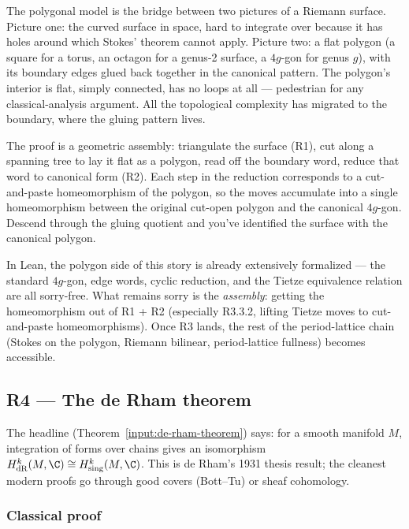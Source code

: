 \begin{layman}
The polygonal model is the bridge between two pictures of a Riemann
surface.  Picture one: the curved surface in space, hard to
integrate over because it has holes around which Stokes' theorem
cannot apply.  Picture two: a flat polygon (a square for a torus, an
octagon for a genus-2 surface, a \(4g\)-gon for genus \(g\)), with
its boundary edges glued back together in the canonical pattern.
The polygon's interior is flat, simply connected, has no loops at
all --- pedestrian for any classical-analysis argument.  All the
topological complexity has migrated to the boundary, where the
gluing pattern lives.

The proof is a geometric assembly: triangulate the surface (R1), cut
along a spanning tree to lay it flat as a polygon, read off the
boundary word, reduce that word to canonical form (R2).  Each step
in the reduction corresponds to a cut-and-paste homeomorphism of the
polygon, so the moves accumulate into a single homeomorphism between
the original cut-open polygon and the canonical \(4g\)-gon.  Descend
through the gluing quotient and you've identified the surface with
the canonical polygon.

In Lean, the polygon side of this story is already extensively
formalized --- the standard \(4g\)-gon, edge words, cyclic reduction,
and the Tietze equivalence relation are all sorry-free.  What
remains sorry is the \emph{assembly}: getting the homeomorphism out
of R1 + R2 (especially R3.3.2, lifting Tietze moves to cut-and-paste
homeomorphisms).  Once R3 lands, the rest of the period-lattice
chain (Stokes on the polygon, Riemann bilinear, period-lattice
fullness) becomes accessible.
\end{layman}

\subsection{R4 --- The de Rham theorem}
\label{subsec:gap-R4-de-rham}

The headline (Theorem~\ref{input:de-rham-theorem}) says: for a smooth
manifold \(M\), integration of forms over chains gives an isomorphism
\(H^k_{\mathrm{dR}}(M, \C) \cong H^k_{\mathrm{sing}}(M, \C)\).  This is
de Rham's 1931 thesis result; the cleanest modern proofs go through
good covers (Bott--Tu) or sheaf cohomology.

\subsubsection*{Classical proof}

